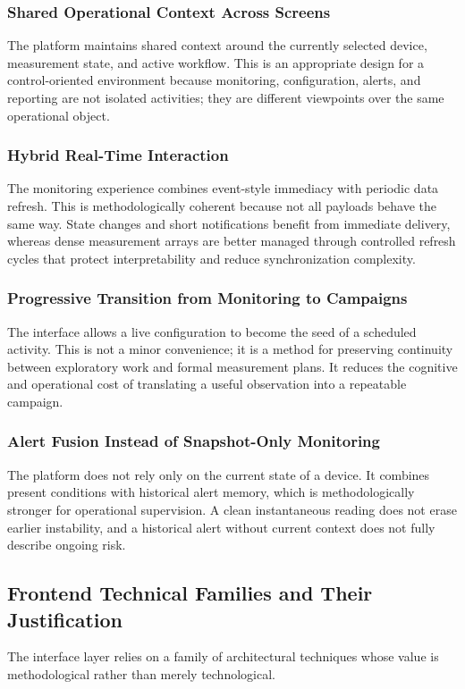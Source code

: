 \documentclass[11pt,a4paper]{article}
\begin{document}
\subsubsection{Shared Operational Context Across Screens}
The platform maintains shared context around the currently selected device, measurement state, and active workflow. This is an appropriate design for a control-oriented environment because monitoring, configuration, alerts, and reporting are not isolated activities; they are different viewpoints over the same operational object.

\subsubsection{Hybrid Real-Time Interaction}
The monitoring experience combines event-style immediacy with periodic data refresh. This is methodologically coherent because not all payloads behave the same way. State changes and short notifications benefit from immediate delivery, whereas dense measurement arrays are better managed through controlled refresh cycles that protect interpretability and reduce synchronization complexity.

\subsubsection{Progressive Transition from Monitoring to Campaigns}
The interface allows a live configuration to become the seed of a scheduled activity. This is not a minor convenience; it is a method for preserving continuity between exploratory work and formal measurement plans. It reduces the cognitive and operational cost of translating a useful observation into a repeatable campaign.

\subsubsection{Alert Fusion Instead of Snapshot-Only Monitoring}
The platform does not rely only on the current state of a device. It combines present conditions with historical alert memory, which is methodologically stronger for operational supervision. A clean instantaneous reading does not erase earlier instability, and a historical alert without current context does not fully describe ongoing risk.

\subsection{Frontend Technical Families and Their Justification}
The interface layer relies on a family of architectural techniques whose value is methodological rather than merely technological.
\end{document}
